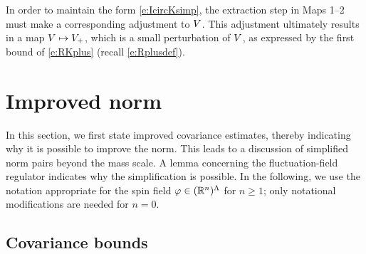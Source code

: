 \begin{rk}
In order to maintain the form \eqref{e:IcircKsimp}, the extraction step in Maps 1--2
must make a corresponding adjustment to $V$. This adjustment ultimately results in a
map $V \mapsto V_+$, which is a small perturbation of $V$, as expressed
by the first bound of \eqref{e:RKplus} (recall \eqref{e:Rplusdef}).
\end{rk}


\section{Improved norm}
\label{sec:Rpf1}

In this section, we first
state improved covariance estimates, thereby indicating why it is possible
to improve the norm.
This leads to a discussion of simplified norm pairs beyond the mass
scale.  A lemma concerning the fluctuation-field regulator indicates why the
simplification is possible.
In the following, we use the notation appropriate for the spin field
$\varphi \in ({\mathbb R}^n)^\Lambda$ for $n \ge 1$; only notational modifications are needed for
$n=0$.


\subsection{Covariance bounds}
\label{sec:Cbds}

